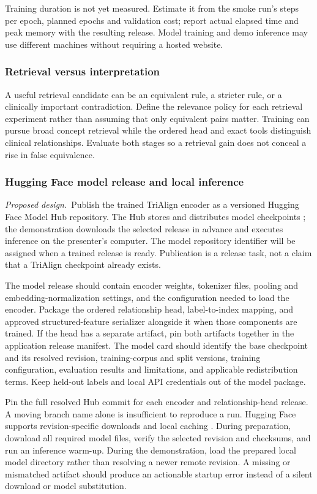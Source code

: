 \documentclass[10pt,letterpaper]{article}
\newcommand{\planned}{\textit{Proposed design.}}
\begin{document}
Training duration is not yet measured. Estimate it from the smoke run's
steps per epoch, planned epochs and validation cost; report actual elapsed
time and peak memory with the resulting release. Model training and demo
inference may use different machines without requiring a hosted website.

\subsubsection{Retrieval versus interpretation}
A useful retrieval candidate can be an equivalent rule, a stricter rule, or a
clinically important contradiction. Define the relevance policy for each
retrieval experiment rather than assuming that only equivalent pairs matter.
Training can pursue broad concept retrieval while the ordered head and exact
tools distinguish clinical relationships. Evaluate both stages so a retrieval
gain does not conceal a rise in false equivalence.

\subsubsection{Hugging Face model release and local inference}
\label{sec:modelrelease}
\planned\ Publish the trained TriAlign encoder as a versioned Hugging Face
Model Hub repository. The Hub stores and distributes model checkpoints
\cite{hfhub}; the demonstration downloads the selected release in advance
and executes inference on the presenter's computer. The model repository
identifier will be assigned when a trained release is ready. Publication is
a release task, not a claim that a TriAlign checkpoint already exists.

The model release should contain encoder weights, tokenizer files, pooling
and embedding-normalization settings, and the configuration needed to load
the encoder. Package the ordered relationship head, label-to-index mapping,
and approved structured-feature serializer alongside it when those components
are trained. If the head has a separate artifact, pin both artifacts together
in the application release manifest. The model card should identify the base
checkpoint and its resolved revision, training-corpus and split versions,
training configuration, evaluation results and limitations, and applicable
redistribution terms. Keep held-out labels and local API credentials out of
the model package.

Pin the full resolved Hub commit for each encoder and relationship-head
release. A moving branch name alone is insufficient to reproduce a run.
Hugging Face supports revision-specific downloads and local caching
\cite{hfdownload}. During preparation, download all required model files,
verify the selected revision and checksums, and run an inference warm-up.
During the demonstration, load the prepared local model directory rather
than resolving a newer remote revision. A missing or mismatched artifact
should produce an actionable startup error instead of a silent download or
model substitution.
\end{document}
